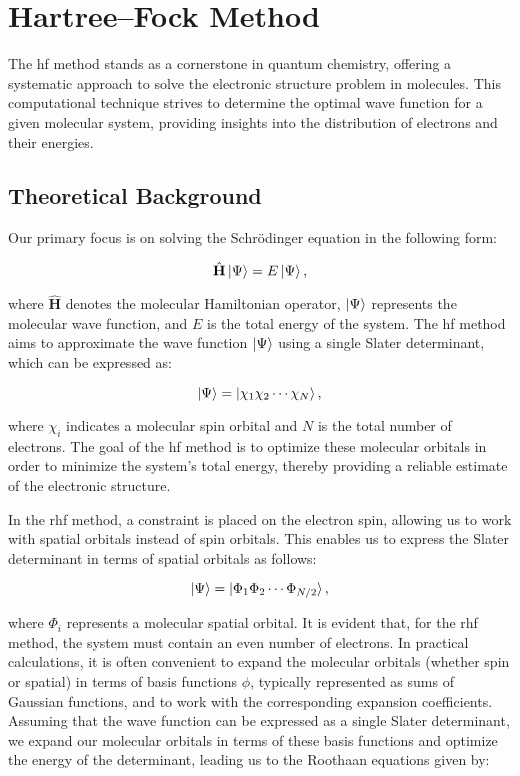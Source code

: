 \chapter{Hartree--Fock Method}

The \acrfull{hf} method stands as a cornerstone in quantum chemistry, offering a systematic approach to solve the electronic structure problem in molecules. This computational technique strives to determine the optimal wave function for a given molecular system, providing insights into the distribution of electrons and their energies.

\section{Theoretical Background}

Our primary focus is on solving the Schrödinger equation in the following form:

\begin{equation}
\hat{\mathbf{H}}\ket{\Psi}=E\ket{\Psi},
\end{equation}

where \(\hat{\mathbf{H}}\) denotes the molecular Hamiltonian operator, \(\ket{\Psi}\) represents the molecular wave function, and \(E\) is the total energy of the system. The \acrshort{hf} method aims to approximate the wave function \(\ket{\Psi}\) using a single Slater determinant, which can be expressed as:

\begin{equation}
\ket{\Psi}=\ket{\chi_1\chi_2\cdots\chi_N},
\end{equation}

where \(\chi_i\) indicates a molecular spin orbital and \(N\) is the total number of electrons. The goal of the \acrshort{hf} method is to optimize these molecular orbitals in order to minimize the system's total energy, thereby providing a reliable estimate of the electronic structure.

In the \acrfull{rhf} method, a constraint is placed on the electron spin, allowing us to work with spatial orbitals instead of spin orbitals. This enables us to express the Slater determinant in terms of spatial orbitals as follows:

\begin{equation}
\ket{\Psi}=\ket{\Phi_1\Phi_2\cdots\Phi_{N/2}},
\end{equation}

where \(\Phi_i\) represents a molecular spatial orbital. It is evident that, for the \acrshort{rhf} method, the system must contain an even number of electrons. In practical calculations, it is often convenient to expand the molecular orbitals (whether spin or spatial) in terms of basis functions \(\phi\), typically represented as sums of Gaussian functions, and to work with the corresponding expansion coefficients. Assuming that the wave function can be expressed as a single Slater determinant, we expand our molecular orbitals in terms of these basis functions and optimize the energy of the determinant, leading us to the Roothaan equations given by:

